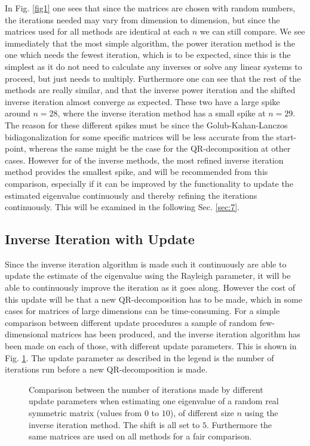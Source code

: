 \documentclass[twocolumn]{article}
\begin{document}
In Fig. \ref{fig1} one sees that since the matrices are chosen with random numbers, the iterations needed may vary from dimension to dimension, but since the matrices used for all methods are identical at each $n$ we can still compare. We see immediately that the most simple algorithm, the power iteration method is the one which needs the fewest iteration, which is to be expected, since this is the simplest as it do not need to calculate any inverses or solve any linear systems to proceed, but just needs to multiply. Furthermore one can see that the rest of the methods are really similar, and that the inverse power iteration and the shifted inverse iteration almost converge as expected. These two have a large spike around $n=28$, where the inverse iteration method has a small spike at $n=29$. The reason for these different spikes must be since the Golub-Kahan-Lanczos bidiagonalization for some specific matrices will be less accurate from the start-point, whereas the same might be the case for the QR-decomposition at other cases. However for of the inverse methods, the most refined inverse iteration method provides the smallest spike, and will be recommended from this comparison, especially if it can be improved by the functionality to update the estimated eigenvalue continuously and thereby refining the iterations continuously. This will be examined in the following Sec. \ref{sec:7}.

\subsection{\label{sec:7} Inverse Iteration with Update}
Since the inverse iteration algorithm is made such it continuously are able to update the estimate of the eigenvalue using the Rayleigh parameter, it will be able to continuously improve the iteration as it goes along. However the cost of this update will be that a new QR-decomposition has to be made, which in some cases for matrices of large dimensions can be time-consuming.
For a simple comparison between different update procedures a sample of random few-dimensional matrices has been produced, and the inverse iteration algorithm has been made on each of those, with different update parameters. This is shown in Fig. \ref{fig2}. The update parameter as described in the legend is the number of iterations run before a new QR-decomposition is made.

  \begin{figure}[h]

\caption{Comparison between the number of iterations made by different update parameters when estimating one eigenvalue of a random real symmetric matrix (values from $0$ to $10$), of different size $n$ using the inverse iteration method. The shift is all set to $5$. Furthermore the same matrices are used on all methods for a fair comparison.}
\label{fig2}
\end{figure}
\end{document}
